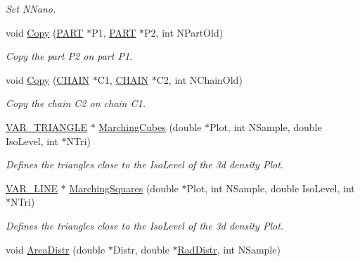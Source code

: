 \begin{DoxyCompactItemize}
\begin{DoxyCompactList}\small\item\em Set N\+Nano. \end{DoxyCompactList}\item 
void \hyperlink{classVarData_a4de27ea0167e58319a6848705a423e03}{Copy} (\hyperlink{structPART}{P\+A\+RT} $\ast$P1, \hyperlink{structPART}{P\+A\+RT} $\ast$P2, int N\+Part\+Old)\hypertarget{classVarData_a4de27ea0167e58319a6848705a423e03}{}\label{classVarData_a4de27ea0167e58319a6848705a423e03}

\begin{DoxyCompactList}\small\item\em Copy the part P2 on part P1. \end{DoxyCompactList}\item 
void \hyperlink{classVarData_a6b4ad600104f81b994be59a1e98be6a6}{Copy} (\hyperlink{structCHAIN}{C\+H\+A\+IN} $\ast$C1, \hyperlink{structCHAIN}{C\+H\+A\+IN} $\ast$C2, int N\+Chain\+Old)\hypertarget{classVarData_a6b4ad600104f81b994be59a1e98be6a6}{}\label{classVarData_a6b4ad600104f81b994be59a1e98be6a6}

\begin{DoxyCompactList}\small\item\em Copy the chain C2 on chain C1. \end{DoxyCompactList}\item 
\hyperlink{structVAR__TRIANGLE}{V\+A\+R\+\_\+\+T\+R\+I\+A\+N\+G\+LE} $\ast$ \hyperlink{classVarData_a3bc3dc1509a0daee21e6bdf7e7a39257}{Marching\+Cubes} (double $\ast$Plot, int N\+Sample, double Iso\+Level, int $\ast$N\+Tri)\hypertarget{classVarData_a3bc3dc1509a0daee21e6bdf7e7a39257}{}\label{classVarData_a3bc3dc1509a0daee21e6bdf7e7a39257}

\begin{DoxyCompactList}\small\item\em Defines the triangles close to the Iso\+Level of the 3d density Plot. \end{DoxyCompactList}\item 
\hyperlink{structVAR__LINE}{V\+A\+R\+\_\+\+L\+I\+NE} $\ast$ \hyperlink{classVarData_ae89cde22b05a3a014347e1fd3282b4dc}{Marching\+Squares} (double $\ast$Plot, int N\+Sample, double Iso\+Level, int $\ast$N\+Tri)\hypertarget{classVarData_ae89cde22b05a3a014347e1fd3282b4dc}{}\label{classVarData_ae89cde22b05a3a014347e1fd3282b4dc}

\begin{DoxyCompactList}\small\item\em Defines the triangles close to the Iso\+Level of the 3d density Plot. \end{DoxyCompactList}\item 
void \hyperlink{classVarData_a33ca5c0b94de056eb4425e9c5ce9905c}{Area\+Distr} (double $\ast$Distr, double $\ast$\hyperlink{classVarData_a4d034e14a193c9943528897b0356ef42}{Rad\+Distr}, int N\+Sample)\hypertarget{classVarData_a33ca5c0b94de056eb4425e9c5ce9905c}{}\label{classVarData_a33ca5c0b94de056eb4425e9c5ce9905c}


\end{DoxyCompactItemize}

